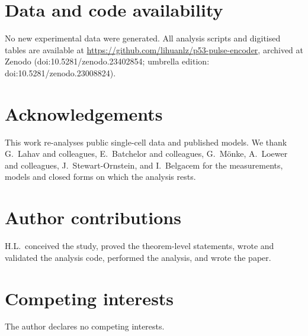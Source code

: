 \documentclass[11pt,a4paper]{article}
\begin{document}
\section*{Data and code availability}

No new experimental data were generated. All analysis scripts and digitised tables are available at \url{https://github.com/lihuanlz/p53-pulse-encoder}, archived at Zenodo (doi:10.5281/zenodo.23402854; umbrella edition: doi:10.5281/zenodo.23008824).

\section*{Acknowledgements}

This work re-analyses public single-cell data and published models. We thank G.~Lahav and colleagues, E.~Batchelor and colleagues, G.~M\"onke, A.~Loewer and colleagues, J.~Stewart-Ornstein, and I.~Belgacem for the measurements, models and closed forms on which the analysis rests.

\section*{Author contributions}

H.L.\ conceived the study, proved the theorem-level statements, wrote and validated the analysis code, performed the analysis, and wrote the paper.

\section*{Competing interests}

The author declares no competing interests.
\end{document}
